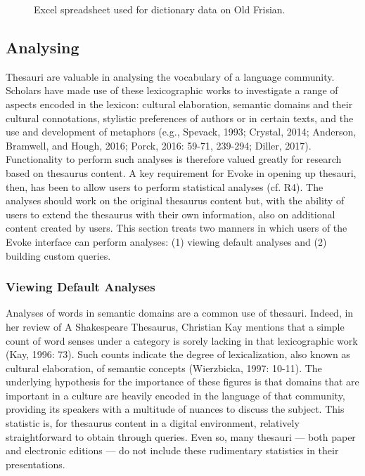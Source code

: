 \begin{figure}[htbp]
	\caption[]{\label{fig:Stolk2021a:Fig12} Excel spreadsheet used for dictionary data on Old Frisian.}
\end{figure}

\subsection{Analysing}
Thesauri are valuable in analysing the vocabulary of a language community. Scholars have made use of these lexicographic works to investigate a range of aspects encoded in the lexicon: cultural elaboration, semantic domains and their cultural connotations, stylistic preferences of authors or in certain texts, and the use and development of metaphors (e.g., Spevack, 1993; Crystal, 2014; Anderson, Bramwell, and Hough, 2016; Porck, 2016: 59-71, 239-294; Diller, 2017).  Functionality to perform such analyses is therefore valued greatly for research based on thesaurus content. A key requirement for Evoke in opening up thesauri, then, has been to allow users to perform statistical analyses (cf. R4). The analyses should work on the original thesaurus content but, with the ability of users to extend the thesaurus with their own information, also on additional content created by users. This section treats two manners in which users of the Evoke interface can perform analyses: (1) viewing default analyses and (2) building custom queries.  

\subsubsection{Viewing Default Analyses}
Analyses of words in semantic domains are a common use of thesauri. Indeed, in her review of A Shakespeare Thesaurus, Christian Kay mentions that a simple count of word senses under a category is sorely lacking in that lexicographic work (Kay, 1996: 73). Such counts indicate the degree of lexicalization, also known as cultural elaboration, of semantic concepts (Wierzbicka, 1997: 10-11). The underlying hypothesis for the importance of these figures is that domains that are important in a culture are heavily encoded in the language of that community, providing its speakers with a multitude of nuances to discuss the subject. This statistic is, for thesaurus content in a digital environment, relatively straightforward to obtain through queries. Even so, many thesauri — both paper and electronic editions — do not include these rudimentary statistics in their presentations.  

